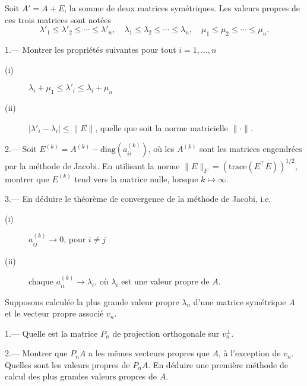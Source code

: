 \begin{exo}\label{exo54}\rm
Soit $A'=A+E$, la somme de deux matrices symétriques. Les valeurs propres
de ces trois matrices sont notées
$$
\lambda'_1\le \lambda'_2\le\cdots\le\lambda'_n,\quad
\lambda_1\le \lambda_2\le\cdots\le\lambda_n,\quad
\mu_1\le\mu_2\le\cdots\le\mu_n.
$$

1.--- Montrer les propriétés suivantes pour tout $i=1,\ldots,n$
\begin{description}
\item[(i)] $\lambda_i+\mu_1\le\lambda'_i\le\lambda_i+\mu_n$
\item[(ii)] $|\lambda'_i-\lambda_i|\le \parallel E\parallel$, quelle que soit 
la norme matricielle $\parallel\cdot\parallel$.
\end{description}

2.--- Soit $E^{(k)}=A^{(k)}-\mathrm{diag}(a_{ii}^{(k)})$, o\`u les
$A^{(k)}$ sont les matrices engendrées par la méthode de Jacobi.
En utilisant la norme $\parallel E\parallel_F=(\mbox{trace}(E^\top E))^{1/2}$,
montrer que $E^{(k)}$ tend vers la matrice nulle, lorsque 
$k\longmapsto \infty$.

3.--- En déduire le théorème de convergence de la méthode de Jacobi, i.e.
\begin{description}
\item[(i)] $a_{ij}^{(k)}\longrightarrow 0$, pour $i\ne j$
\item[(ii)] chaque $a_{ii}^{(k)}\longrightarrow \lambda_i$, o\`u $\lambda_i$
est une valeur propre de $A$. 
\end{description}
\end{exo}

\begin{exo}\rm
Supposons calculée la plus grande valeur propre $\lambda_n$ d'une 
matrice symétrique $A$ et le vecteur propre associé $v_n$.

1.--- Quelle est la matrice $P_n$ de projection orthogonale sur 
$v_n^\perp$.

2.--- Montrer que $P_nA$ a les m\^emes vecteurs propres que $A$, à
l'exception de $v_n$. Quelles sont les valeurs propres de $P_nA$.
En déduire une première méthode de calcul des plus grandes valeurs 
propres de $A$.
\end{exo}


